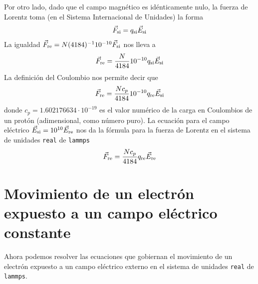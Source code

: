 \documentclass{article}
\newcommand{\internationalUnitSystem}{\textnormal{si}}
\newcommand{\realUnitSystem}{\textnormal{re}}
\begin{document}
  Por otro lado, dado que el campo magnético es idénticamente nulo, la fuerza de Lorentz toma (en el Sistema Internacional de Unidades) la forma
  \begin{align}
    \vec{F}_{\internationalUnitSystem}
    =
    q_{\internationalUnitSystem} \vec{E}_{\internationalUnitSystem}
  \end{align}
  La igualdad \(\vec{F}_{\realUnitSystem} = N (4184)^{-1} 10^{- 10} \vec{F}_{\internationalUnitSystem}\) nos lleva a
  \begin{align}
    \vec{F}_{\realUnitSystem}
    =
    \frac{N}{4184} 10^{- 10}
    q_{\internationalUnitSystem} \vec{E}_{\internationalUnitSystem}
  \end{align} 
  La definición del Coulombio nos permite decir que
  \begin{align}
    \vec{F}_{\realUnitSystem}
    =
    \frac{N c_p}{4184} 10^{- 10}
    q_{\realUnitSystem} \vec{E}_{\internationalUnitSystem}
  \end{align}
  donde \(c_p = 1.602 176 634 \cdot 10^{- 19}\) es el valor numérico de la carga en Coulombios de un protón (adimensional, como número puro).
  La ecuación para el campo eléctrico \(\vec{E}_{\internationalUnitSystem} = 10^{10} \vec{E}_{\realUnitSystem}\) nos da la fórmula para la fuerza de Lorentz en el sistema de unidades \texttt{real} de \texttt{lammps}
  \begin{align}
    \vec{F}_{\realUnitSystem}
    =
    \frac{N c_p}{4184}
    q_{\realUnitSystem} \vec{E}_{\realUnitSystem}
  \end{align}

  \section{Movimiento de un electrón expuesto a un campo eléctrico constante}
  Ahora podemos resolver las ecuaciones que gobiernan el movimiento de un electrón expuesto a un campo eléctrico externo en el sistema de unidades \texttt{real} de \texttt{lammps}.
\end{document}
